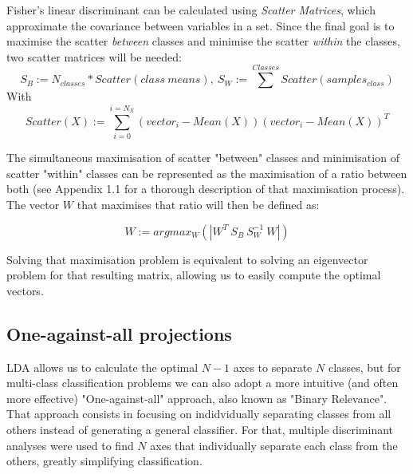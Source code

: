 \documentclass{bmvc2k}
\begin{document}
Fisher's linear discriminant can be calculated using \textit{Scatter Matrices}, which approximate the covariance between variables in a set\cite{fisherUt}. Since the final goal is to maximise the scatter \textit{between} classes and minimise the scatter \textit{within} the classes, two scatter matrices will be needed:
\begin{equation}\label{scatter}
   S_B := N_{classes}*Scatter(class\ means),\  
   S_W := \sum^{Classes}Scatter(samples_{class})
\end{equation}
With
\begin{equation}
   Scatter(X) := \sum_{i=0}^{i=N_X} (vector_i-Mean(X))(vector_i-Mean(X))^T
\end{equation}

The simultaneous maximisation of scatter "between" classes and minimisation of scatter "within" classes can be represented as the maximisation of a ratio between both (see Appendix 1.1 \cite{appendix} for a thorough description of that maximisation process). The vector $W$ that maximises that ratio will then be defined as:

\begin{equation}\label{eigen}
   W :=  argmax_W(|W^T\ S_B\ S_W^{-1}\ W|)
\end{equation}

Solving that maximisation problem is equivalent\cite{face} to solving an eigenvector problem for that resulting matrix, allowing us to easily compute the optimal vectors.

\subsection{One-against-all projections}

LDA allows us to calculate the optimal $N-1$ axes to separate $N$ classes, but for multi-class classification problems we can also adopt a more intuitive (and often more effective) "One-against-all" approach, also known as "Binary Relevance"\cite{binary}. That approach consists in focusing on indidvidually separating classes from all others instead of generating a general classifier. For that, multiple discriminant analyses were used to find $N$ axes that individually separate each class from the others, greatly simplifying classification.
\end{document}
